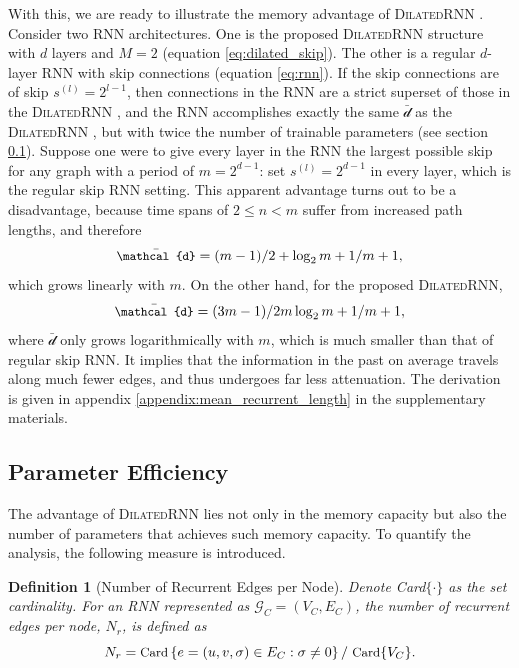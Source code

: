 \documentclass{article}
\newtheorem{definition}{Definition}[section]
\newcommand{\algname}{\textsc{DilatedRNN }}
\newcommand{\algnamens}{\textsc{DilatedRNN}}
\begin{document}
With this, we are ready to illustrate the memory advantage of \algname. Consider two RNN architectures. One is the proposed \algname structure with $d$ layers and $M = 2$ (equation \eqref{eq:dilated_skip}). The other is a regular $d$-layer RNN with skip connections (equation \eqref{eq:rnn}).  If the skip connections are of skip $s^{(l)}=2^{l-1}$, then connections in the RNN are a strict superset of those in the \algname, and the RNN accomplishes exactly the same $\bar{\mathcal{d}}$ as the \algname, but with twice the number of trainable parameters (see section \ref{sec:efficiency}).  Suppose one were to give every layer in the RNN the largest possible skip for any graph with a period of $m=2^{d-1}$: set $s^{(l)}=2^{d-1}$ in every layer, which is the regular skip RNN setting.  This apparent advantage turns out to be a disadvantage, because time spans of $2\le n<m$ suffer from increased path lengths, and therefore 
\begin{equation}
\small
\bar{\mathcal{d}} = (m-1)/2 + \log_2{m} + 1/m + 1,
\end{equation}
which grows linearly with $m$. On the other hand, for the proposed \algnamens, 
\begin{equation}
\small
\bar{\mathcal{d}} = (3m-1)/2m \log_2 m + 1/m + 1,
\end{equation}
where $\bar{\mathcal{d}}$ only grows logarithmically with $m$, which is much smaller than that of regular skip RNN. It implies that the information in the past on average travels along much fewer edges, and thus undergoes far less attenuation.  The derivation is given in appendix \ref{appendix:mean_recurrent_length} in the supplementary materials.

\subsection{Parameter Efficiency}
\label{sec:efficiency}

The advantage of \algname lies not only in the memory capacity but also the number of parameters that achieves such memory capacity. To quantify the analysis, the following measure is introduced.
\begin{definition}[Number of Recurrent Edges per Node]
Denote Card$\{\cdot\}$ as the set cardinality. For an RNN represented as $\mathcal{G}_C = (V_C, E_C)$, the number of recurrent edges per node, $N_r$, is defined as
\begin{equation}
\small
N_r = \mbox{Card}\left\{ e = (u,v,\sigma) \in E_C: \sigma \neq 0 \right\} / ~\mbox{Card} \{V_C\}.
\end{equation}
\end{definition}
\end{document}
